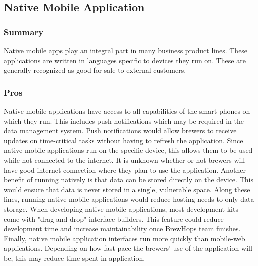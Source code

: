 \documentclass[draftclsnofoot,onecolumn,letterpaper,10pt,compsoc]{IEEEtran}
\begin{document}
			\subsection{Native Mobile Application}
		        \subsubsection{Summary}
		            Native mobile apps play an integral part in many business product lines.
		            These applications are written in languages specific to devices they run on.
		            These are generally recognized as good for sale to external customers\cite{SearchCloudOverview}.

		        \subsubsection{Pros}
		            Native mobile applications have access to all capabilities of the smart phones on which they run.
		            This includes push notifications which may be required in the data management system.
		            Push notifications would allow brewers to receive updates on time-critical tasks without having to refresh the application.
		            Since native mobile applications run on the specific device, this allows them to be used while not connected to the internet.
		            It is unknown whether or not brewers will have good internet connection where they plan to use the application.
		            Another benefit of running natively is that data can be stored directly on the device.
		            This would ensure that data is never stored in a single, vulnerable space.
		            Along these lines, running native mobile applications would reduce hosting needs to only data storage.
		            When developing native mobile applications, most development kits come with "drag-and-drop" interface builders.
		            This feature could reduce development time and increase maintainability once BrewHops team finishes.
		            Finally, native mobile application interfaces run more quickly than mobile-web applications.
		            Depending on how fast-pace the brewers' use of the application will be, this may reduce time spent in application.
\end{document}

